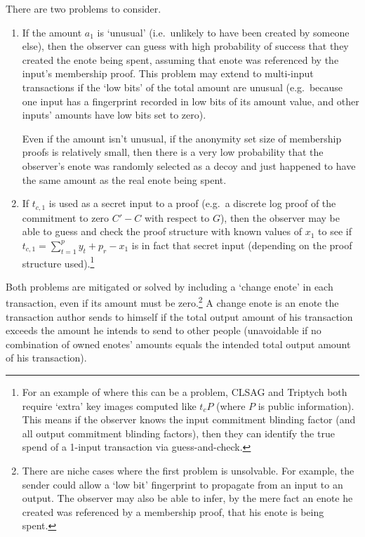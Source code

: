 There are two problems to consider.
\begin{enumerate}
    \item If the amount $a_1$ is `unusual' (i.e.\ unlikely to have been created by someone else), then the observer can guess with high probability of success that they created the enote being spent, assuming that enote was referenced by the input's membership proof. This problem may extend to multi-input transactions if the `low bits' of the total amount are unusual (e.g.\ because one input has a fingerprint recorded in low bits of its amount value, and other inputs' amounts have low bits set to zero).

    Even if the amount isn't unusual, if the anonymity set size of membership proofs is relatively small, then there is a very low probability that the observer's enote was randomly selected as a decoy and just happened to have the same amount as the real enote being spent.

    \item If $t_{c,1}$ is used as a secret input to a proof (e.g.\ a discrete log proof of the commitment to zero $C' - C$ with respect to $G$), then the observer may be able to guess and check the proof structure with known values of $x_1$ to see if $t_{c,1} = \sum^{p}_{t=1} y_t + p_r - x_1$ is in fact that secret input (depending on the proof structure used).\footnote{For an example of where this can be a problem, CLSAG \cite{clsag-eprint} and Triptych \cite{triptych-preprint} both require `extra' key images computed like $t_c P$ (where $P$ is public information). This means if the observer knows the input commitment blinding factor (and all output commitment blinding factors), then they can identify the true spend of a 1-input transaction via guess-and-check.}
\end{enumerate}

Both problems are mitigated or solved by including a `change enote' in each transaction, even if its amount must be zero.\footnote{There are niche cases where the first problem is unsolvable. For example, the sender could allow a `low bit' fingerprint to propagate from an input to an output. The observer may also be able to infer, by the mere fact an enote he created was referenced by a membership proof, that his enote is being spent.} A change enote is an enote the transaction author sends to himself if the total output amount of his transaction exceeds the amount he intends to send to other people (unavoidable if no combination of owned enotes' amounts equals the intended total output amount of his transaction).




